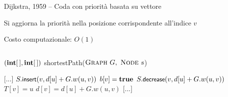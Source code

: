 \begin{frame}{Dijkstra, 1959 -- Coda con priorità basata su vettore}

\smallskip
{}
\BI
\item Si aggiorna la priorità nella posizione corrispondente all'indice $v$
\item Costo computazionale: $O(1)$
\EI

\vspace{-18pt}
\begin{columns}
\small
\begin{Procedure}
\caption[A]{$(\INTARRAY, \INTARRAY)$ \textsf{shortestPath}($\textsc{Graph}\ G,\ \textsc{Node}\ s$)}
[...]\;
    {
      {
        $S.\textsf{{\small insert}}(v, d[u]+G.w(u,v))$\;
        $b[v] = \TRUE$\;
      }
      {
        \alert{$S.\textsf{{\small decrease}}(v, d[u]+G.w(u,v))$}
      }
      $T[v] = u$\;
      $d[v] = d[u] + G.w(u,v)$\;
    }
[...]\;
\end{Procedure}
\end{columns}

\end{frame}

